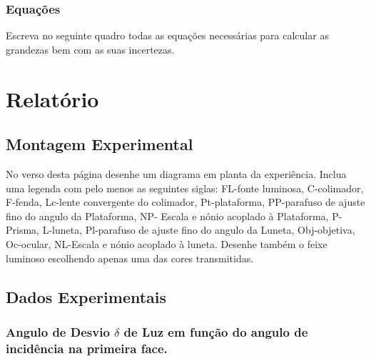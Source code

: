 \documentclass[a4paper,12pt]{article}  %
\begin{document}
\subsubsection{\sf Equações }
Escreva no seguinte quadro todas as equações necessárias para calcular as grandezas bem com as suas incertezas.
\begin{center}
\framebox[15cm]{\rule{0pt}{6.5cm}}
\end{center}


\section{\sf Relatório}
\subsection{\sf Montagem Experimental}
No verso desta página desenhe um diagrama em planta da experiência. Inclua uma  legenda com pelo menos as seguintes siglas: FL-fonte luminosa, C-colimador, F-fenda, Lc-lente convergente do colimador, Pt-plataforma, PP-parafuso de ajuste fino do angulo da Plataforma,  NP- Escala e nónio acoplado à Plataforma, P-Prisma, L-luneta, Pl-parafuso de ajuste fino do angulo da Luneta, Obj-objetiva, Oc-ocular,  NL-Escala e nónio acoplado à luneta. Desenhe também o feixe luminoso escolhendo apenas uma das cores transmitidas.




\subsection{\sf Dados Experimentais}\label{sec:dados}
\subsubsection{Angulo de Desvio $\delta$ de Luz em função do angulo de incidência na primeira face.
}\label{sec:desvio}
\end{document}
